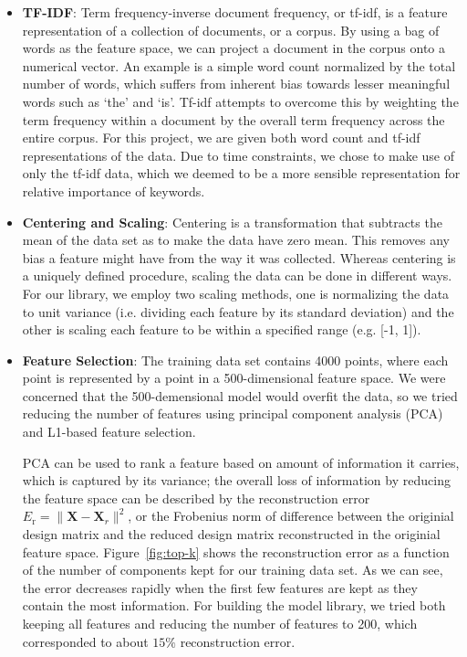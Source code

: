 \documentclass{article}
\renewcommand{\(}{\left(}
\renewcommand{\)}{\right)}
\begin{document}
  \begin{itemize}
    \item \textbf{TF-IDF}: Term frequency-inverse document frequency, or tf-idf, is a feature representation of a collection of documents, or a corpus. By using a bag of words as the feature space, we can project a document in the corpus onto a numerical vector.  An example is a simple word count normalized by the total number of words, which suffers from inherent bias towards lesser meaningful words such as `the' and `is'.  Tf-idf attempts to overcome this by weighting the term frequency within a document by the overall term frequency across the entire corpus.  For this project, we are given both word count and tf-idf representations of the data.  Due to time constraints, we chose to make use of only the tf-idf data, which we deemed to be a more sensible representation for relative importance of keywords.

    \item \textbf{Centering and Scaling}: Centering is a transformation that subtracts the mean of the data set as to make the data have zero mean.  This removes any bias a feature might have from the way it was collected. Whereas centering is a uniquely defined procedure, scaling the data can be done in different ways. For our library, we employ two scaling methods, one is normalizing the data to unit variance (i.e. dividing each feature by its standard deviation) and the other is scaling each feature to be within a specified range (e.g. [-1, 1]).     

    \item \textbf{Feature Selection}: The training data set contains 4000 points, where each point is represented by a point in a 500-dimensional feature space.  We were concerned that the 500-demensional model would overfit the data, so we tried reducing the number of features using principal component analysis (PCA) and L1-based feature selection.

      PCA can be used to rank a feature based on amount of information it carries, which is captured by its variance; the overall loss of information by reducing the feature space can be described by the reconstruction error $E_{\text{r}} = \|\mathbf{X}-\mathbf{X}_r\|^2$, or the Frobenius norm of difference between the originial design matrix and the reduced design matrix reconstructed in the originial feature space. Figure~\ref{fig:top-k} shows the reconstruction error as a function of the number of components kept for our training data set.  As we can see, the error decreases rapidly when the first few features are kept as they contain the most information.  For building the model library, we tried both keeping all features and reducing the number of features to 200, which corresponded to about $15\%$ reconstruction error.   


\end{itemize}
\end{document}

